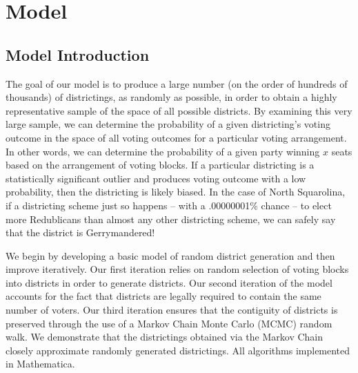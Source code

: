 \documentclass[12pt]{article}
\begin{document}
\section{Model}
    \subsection{Model Introduction}
    The goal of our model is to produce a large number (on the order of hundreds of thousands) of districtings, as randomly as possible, in order to obtain a highly representative sample of the space of all possible districts. By examining this very large sample, we can determine the probability of a given districting's voting outcome in the space of all voting outcomes for a particular voting arrangement. In other words, we can determine the probability of a given party winning \(x\) seats based on the arrangement of voting blocks. If a particular districting is a statistically significant outlier and produces voting outcome with a low probability, then the districting is likely biased. In the case of North Squarolina, if a districting scheme just so happens – with a .00000001\% chance – to elect more Redublicans than almost any other districting scheme, we can safely say that the district is Gerrymandered! 
    \par
    We begin by developing a basic model of random district generation and then improve iteratively. Our first iteration relies on random selection of voting blocks into districts in order to generate districts. Our second iteration of the model accounts for the fact that districts are legally required to contain the same number of voters. Our third iteration ensures that the contiguity of districts is preserved through the use of a Markov Chain Monte Carlo (MCMC) random walk. We demonstrate that the districtings obtained via the Markov Chain closely approximate randomly generated districtings.
    All algorithms implemented in Mathematica.
    \par
\end{document}
